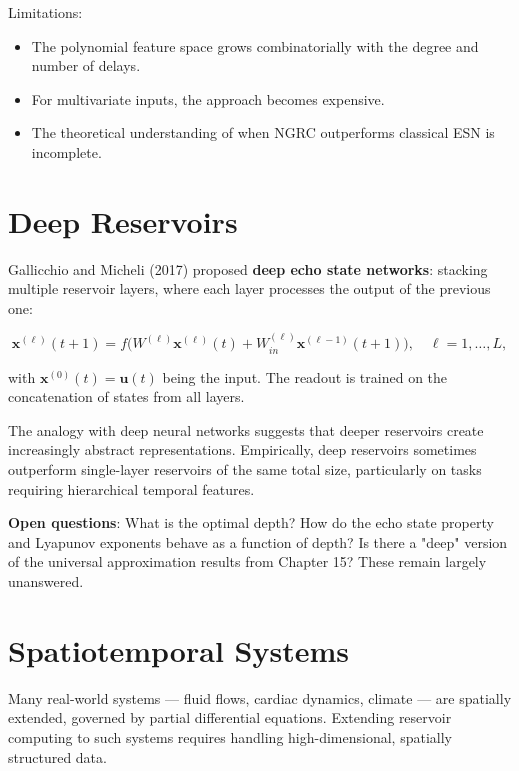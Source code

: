 Limitations:
\begin{itemize}[nosep]
  \item The polynomial feature space grows combinatorially with the degree and number of delays.
  \item For multivariate inputs, the approach becomes expensive.
  \item The theoretical understanding of when NGRC outperforms classical ESN is incomplete.


\bigskip

\end{itemize}

\section{Deep Reservoirs}\label{sec:17.6}

Gallicchio and Micheli (2017) proposed \textbf{deep echo state networks}: stacking multiple reservoir layers, where each layer processes the output of the previous one:

\[
\mathbf{x}^{(\ell)}(t+1) = f\big(W^{(\ell)}\mathbf{x}^{(\ell)}(t) + W_{in}^{(\ell)}\mathbf{x}^{(\ell-1)}(t+1)\big), \quad \ell = 1, \ldots, L,
\]

with $\mathbf{x}^{(0)}(t) = \mathbf{u}(t)$ being the input. The readout is trained on the concatenation of states from all layers.

The analogy with deep neural networks suggests that deeper reservoirs create increasingly abstract representations. Empirically, deep reservoirs sometimes outperform single-layer reservoirs of the same total size, particularly on tasks requiring hierarchical temporal features.

\textbf{Open questions}: What is the optimal depth? How do the echo state property and Lyapunov exponents behave as a function of depth? Is there a "deep" version of the universal approximation results from Chapter 15? These remain largely unanswered.


\bigskip


\section{Spatiotemporal Systems}\label{sec:17.7}

Many real-world systems --- fluid flows, cardiac dynamics, climate --- are spatially extended, governed by partial differential equations. Extending reservoir computing to such systems requires handling high-dimensional, spatially structured data.

